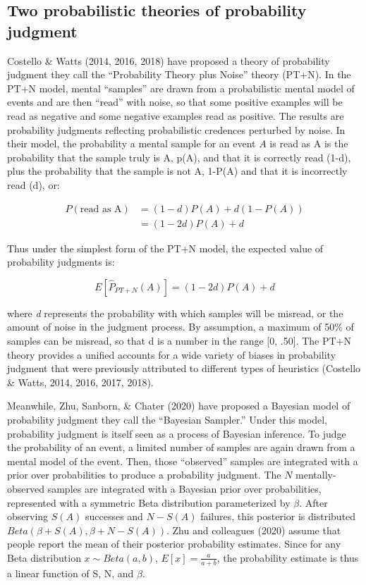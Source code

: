 \documentclass[
  english,
  man,floatsintext]{apa6}
\begin{document}
\hypertarget{two-probabilistic-theories-of-probability-judgment}{%
\subsection{Two probabilistic theories of probability judgment}\label{two-probabilistic-theories-of-probability-judgment}}

Costello \& Watts (2014, 2016, 2018) have proposed a theory of probability judgment they call the ``Probability Theory plus Noise'' theory (PT+N). In the PT+N model, mental ``samples'' are drawn from a probabilistic mental model of events and are then ``read'' with noise, so that some positive examples will be read as negative and some negative examples read as positive. The results are probability judgments reflecting probabilistic credences perturbed by noise. In their model, the probability a mental sample for an event \(A\) is read as A is the probability that the sample truly is A, p(A), and that it is correctly read (1-d), plus the probability that the sample is not A, 1-P(A) and that it is incorrectly read (d), or:

\begin{align*}
  P(\text{read as A}) &= (1-d)P(A) + d(1-P(A)) \\
  &= (1-2d)P(A) + d
\end{align*}

Thus under the simplest form of the PT+N model, the expected value of probability judgments is:

\[E[\hat{P}_{PT+N}(A)] = (1-2d)P(A) + d \]

where \emph{d} represents the probability with which samples will be misread, or the amount of noise in the judgment process. By assumption, a maximum of 50\% of samples can be misread, so that d is a number in the range {[}0, .50{]}. The PT+N theory provides a unified accounts for a wide variety of biases in probability judgment that were previously attributed to different types of heuristics (Costello \& Watts, 2014, 2016, 2017, 2018).

Meanwhile, Zhu, Sanborn, \& Chater (2020) have proposed a Bayesian model of probability judgment they call the ``Bayesian Sampler.'' Under this model, probability judgment is itself seen as a process of Bayesian inference. To judge the probability of an event, a limited number of samples are again drawn from a mental model of the event. Then, those ``observed'' samples are integrated with a prior over probabilities to produce a probability judgment. The \(N\) mentally-observed samples are integrated with a Bayesian prior over probabilities, represented with a symmetric Beta distribution parameterized by \(\beta\). After observing \(S(A)\) successes and \(N - S(A)\) failures, this posterior is distributed \(Beta(\beta + S(A), \beta + N - S(A))\). Zhu and colleagues (2020) assume that people report the mean of their posterior probability estimates. Since for any Beta distribution \(x \sim Beta(a,b)\), \(E[x] = \frac{a}{a+b}\), the probability estimate is thus a linear function of S, N, and \(\beta\).
\end{document}
